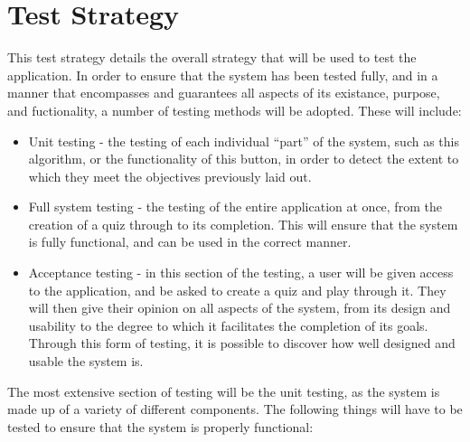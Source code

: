 \section{Test Strategy}
This test strategy details the overall strategy that will be used to test the application. In order to ensure that the system has been tested fully, and in a manner that encompasses and guarantees all aspects of its existance, purpose, and fuctionality, a number of testing methods will be adopted. These will include:

\begin{itemize}
  \item Unit testing - the testing of each individual ``part'' of the system, such as this algorithm, or the functionality of this button, in order to detect the extent to which they meet the objectives previously laid out.

  \item Full system testing - the testing of the entire application at once, from the creation of a quiz through to its completion. This will ensure that the system is fully functional, and can be used in the correct manner.

  \item Acceptance testing - in this section of the testing, a user will be given access to the application, and be asked to create a quiz and play through it. They will then give their opinion on all aspects of the system, from its design and usability to the degree to which it facilitates the completion of its goals. Through this form of testing, it is possible to discover how well designed and usable the system is.
\end{itemize}

The most extensive section of testing will be the unit testing, as the system is made up of a variety of different components. The following things will have to be tested to ensure that the system is properly functional:

